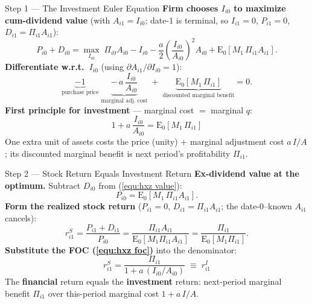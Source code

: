 \documentclass{beamer}
\begin{document}
\begin{frame}{Step 1 --- The Investment Euler Equation}
	\textbf{Firm chooses $I_{i0}$ to maximize cum-dividend value} (with $A_{i1}=I_{i0}$; date-1 is terminal, so $I_{i1}=0$, $P_{i1}=0$, $D_{i1}=\Pi_{i1}A_{i1}$):
	\begin{equation}\label{equ:hxz value}
		P_{i0}+D_{i0}=\max_{I_{i0}}\;\Pi_{i0}A_{i0}-I_{i0}-\frac{a}{2}\!\left(\frac{I_{i0}}{A_{i0}}\right)^{2}\!A_{i0}+\mathrm{E}_0\!\left[M_1\,\Pi_{i1}A_{i1}\right].
	\end{equation}
	\textbf{Differentiate w.r.t.\ $I_{i0}$} (using $\partial A_{i1}/\partial I_{i0}=1$):
	\[
		\underbrace{-1}_{\text{purchase price}}\;\underbrace{-\,a\,\frac{I_{i0}}{A_{i0}}}_{\text{marginal adj.\ cost}}\;+\;\underbrace{\mathrm{E}_0\!\left[M_1\,\Pi_{i1}\right]}_{\text{discounted marginal benefit}}=0.
	\]
	\textbf{First principle for investment} --- marginal cost $=$ marginal $q$:
	\begin{equation}\label{equ:hxz foc}
		\boxed{\;1+a\,\frac{I_{i0}}{A_{i0}}=\mathrm{E}_0\!\left[M_1\,\Pi_{i1}\right]\;}
	\end{equation}
	One extra unit of assets costs the price (unity) $+$ marginal adjustment cost $a\,I/A$; its discounted marginal benefit is next period's profitability $\Pi_{i1}$.
\end{frame}

\begin{frame}{Step 2 --- Stock Return Equals Investment Return}
	\textbf{Ex-dividend value at the optimum.} Subtract $D_{i0}$ from (\ref{equ:hxz value}):
	\[
		P_{i0}=\mathrm{E}_0\!\left[M_1\,\Pi_{i1}A_{i1}\right].
	\]
	\textbf{Form the realized stock return} ($P_{i1}=0$, $D_{i1}=\Pi_{i1}A_{i1}$; the date-0--known $A_{i1}$ cancels):
	\[
		r^S_{i1}=\frac{P_{i1}+D_{i1}}{P_{i0}}=\frac{\Pi_{i1}A_{i1}}{\mathrm{E}_0[M_1\Pi_{i1}A_{i1}]}=\frac{\Pi_{i1}}{\mathrm{E}_0[M_1\Pi_{i1}]}.
	\]
	\textbf{Substitute the FOC (\ref{equ:hxz foc})} into the denominator:
	\begin{equation}\label{equ:hxz invreturn}
		\boxed{\;r^S_{i1}=\frac{\Pi_{i1}}{1+a\,(I_{i0}/A_{i0})}\;\equiv\;r^I_{i1}\;}
	\end{equation}
	The \textbf{financial} return equals the \textbf{investment} return: next-period marginal benefit $\Pi_{i1}$ over this-period marginal cost $1+a\,I/A$. 
\end{frame}
\end{document}
